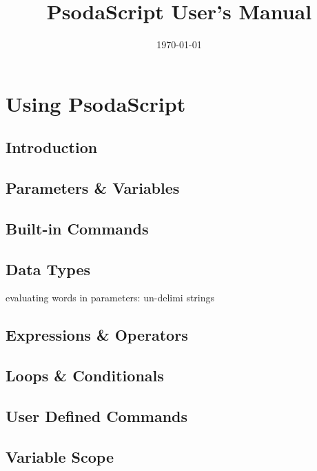 \documentclass[12pt, oneside]{book}
\begin{document}
  
  \frontmatter
  \parskip 7.2pt
  
  \title{PsodaScript User's Manual}
  \date{\today}
  \maketitle

  \tableofcontents
  \listoffigures
  \listoftables
  
  \mainmatter
  
  \part{Using PsodaScript}

  \chapter{Introduction}

  \chapter{Parameters \& Variables}

  \chapter{Built-in Commands}

  \chapter{Data Types}

  evaluating words in parameters: un-delimi strings
  \chapter{Expressions \& Operators}

  \chapter{Loops \& Conditionals}

  \chapter{User Defined Commands}

  \chapter{Variable Scope}
\end{document}
